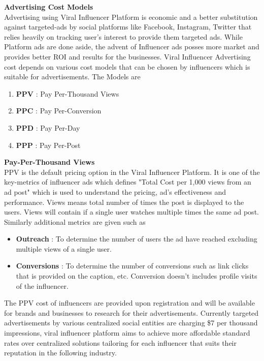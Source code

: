 \documentclass[conference]{IEEEtran}
\begin{document}
\textbf{Advertising Cost Models}\\

Advertising using Viral Influencer Platform is economic and a better substitution against targeted-ads by social platforms like Facebook, Instagram, Twitter that relies heavily on tracking user's interest to provide them targeted ads. While Platform ads are done aside, the advent of Influencer ads posses more market and provides better ROI and results for the businesses. Viral Influencer Advertising cost depends on various cost models that can be chosen by influencers which is suitable for advertisements. The Models are
\begin{enumerate}[wide, labelwidth=!, labelindent=0pt]
\item \textbf{PPV} : Pay Per-Thousand Views
\item \textbf{PPC} : Pay Per-Conversion
\item \textbf{PPD} : Pay Per-Day
\item \textbf{PPP} : Pay Per-Post
\end{enumerate}


\textbf{Pay-Per-Thousand Views}\\

PPV is the default pricing option in the Viral Influencer Platform. It is one of the key-metrics of influencer ads which defines "Total Cost per 1,000 views from an ad post" which is used to understand the pricing, ad's effectiveness and performance. Views means total number of times the post is displayed to the users. Views will contain if a single user watches multiple times the same ad post. Similarly additional metrics are given such as
\begin{itemize}[wide, labelwidth=!, labelindent=0pt]
\item \textbf{Outreach} : To determine the number of users the ad have reached excluding multiple views of a single user.
\item \textbf{Conversions} : To determine the number of conversions such as link clicks that is provided on the caption, etc. Conversion doesn't includes profile visits of the influencer.
\end{itemize}

The PPV cost of influencers are provided upon registration and will be available for brands and businesses to research for their advertisements. Currently targeted advertisements by various centralized social entities are charging \$7 per thousand impressions, viral influencer platform aims to achieve more affordable standard rates over centralized solutions tailoring for each influencer that suits their reputation in the following industry.\\
\end{document}
